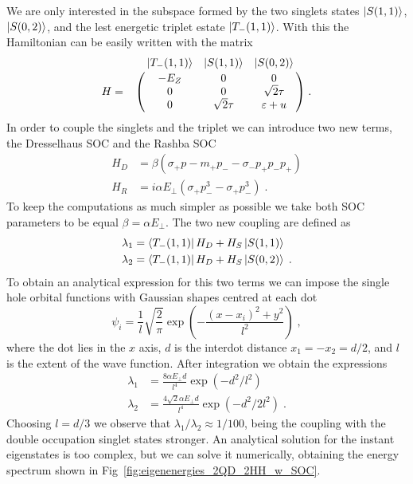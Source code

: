 \documentclass[a4paper,11pt]{article}
\begin{document}
We are only interested in the subspace formed by the two singlets states $\ket{S(1,1)}$, $\ket{S(0,2)}$, and the lest energetic triplet estate $\ket{T_-(1,1)}$. With this the Hamiltonian can be easily written with the matrix
\begin{equation}
	H=\bordermatrix{~ & \ket{T_-(1,1)} & \ket{S(1,1)} & \ket{S(0,2)}\cr
		~ & -E_Z & 0 & 0 \cr
		~ & 0 & 0 & \sqrt{2}\tau \cr
		~ & 0 & \sqrt{2}\tau & \varepsilon+u \cr}\; .
\end{equation}
In order to couple the singlets and the triplet we can introduce two new terms, the Dresselhaus SOC and the Rashba SOC
\begin{equation}
	\begin{split}
	H_D&=\beta(\sigma_+p-m_+p_--\sigma_-p_+p_-p_+)\\
	H_R&=i\alpha E_\perp (\sigma_+p_-^3-\sigma_+p_-^3)\; .
	\end{split}
\end{equation}
To keep the computations as much simpler as possible we take both SOC parameters to be equal $\beta=\alpha E_\perp$. The two new coupling are defined as
\begin{equation}
	\begin{split}
	\lambda_1&=\bra{T_-(1,1)}H_D+H_S\ket{S(1,1)}\\
	\lambda_2&=\bra{T_-(1,1)}H_D+H_S\ket{S(0,2)}\; .
	\end{split}
\end{equation}
To obtain an analytical expression for this two terms we can impose the single hole orbital functions with Gaussian shapes centred at each dot
\begin{equation}
	\psi_i=\frac{1}{l}\sqrt{\frac{2}{\pi}}\exp(-\frac{(x-x_i)^2+y^2}{l^2})\; ,
\end{equation} 
where the dot lies in the $x$ axis, $d$ is the interdot distance $x_1=-x_2=d/2$, and $l$ is the extent of the wave function. After integration we obtain the expressions
\begin{equation}
	\begin{split}
	\lambda_1&=\frac{8\alpha E_\perp d}{l^4}\exp(-d^2/l^2)\\
	\lambda_2&=\frac{4\sqrt{2}\alpha E_\perp d}{l^4}\exp(-d^2/2l^2)\; .
	\end{split}
\end{equation}
Choosing $l=d/3$ we observe that $\lambda_1/\lambda_2\approx 1/100$, being the coupling with the double occupation singlet states stronger. An analytical solution for the instant eigenstates is too complex, but we can solve it numerically, obtaining the energy spectrum shown in Fig~\ref{fig:eigenenergies_2QD_2HH_w_SOC}.
\end{document}
